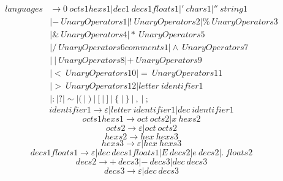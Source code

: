\documentclass{article}
\begin{document}
\begin{equation}
	\begin{aligned}
		languages & \rightarrow 0 \ octs1hexs1 | dec1 \ decs1floats1 | ' \ chars1 | '' \ string1               \\
		          & | - \ UnaryOperators1 | ! \ UnaryOperators2 | \% \ UnaryOperators3                         \\
		          & | \& \ UnaryOperators4 | * \ UnaryOperators5                                               \\
		          & | / \ UnaryOperators6comments1 | \wedge \ UnaryOperators7                                  \\
		          & | \ | \ UnaryOperators8 | + \ UnaryOperators9                                              \\
		          & | < \ UnaryOperators10 | = \ UnaryOperators11                                              \\
		          & | > \ UnaryOperators12 | letter \ identifier1                                              \\
		          & | : | ? | \sim | (  \ | \  )  \ | \  [  \ | \  ]  \ | \  \{  \ | \  \}  \ | \  ,  \ | \  ;
	\end{aligned}
\end{equation}
\begin{equation}
	identifier1 \rightarrow \varepsilon | letter \ identifier1 | dec \ identifier1
\end{equation}
\begin{equation}
	octs1hexs1 \rightarrow oct \ octs2 | x \ hexs2
\end{equation}
\begin{equation}
	octs2 \rightarrow \varepsilon | oct \ octs2
\end{equation}
\begin{equation}
	hexs2 \rightarrow hex \ hexs3
\end{equation}
\begin{equation}
	hexs3 \rightarrow \varepsilon | hex \ hexs3
\end{equation}
\begin{equation}
	decs1floats1 \rightarrow \varepsilon | dec \ decs1floats1 | E \ decs2 | e \ decs2 | . \ floats2
\end{equation}
\begin{equation}
	decs2 \rightarrow + \ decs3 | - \ decs3 | dec \ decs3
\end{equation}
\begin{equation}
	decs3 \rightarrow \varepsilon | dec \ decs3
\end{equation}
\end{document}
